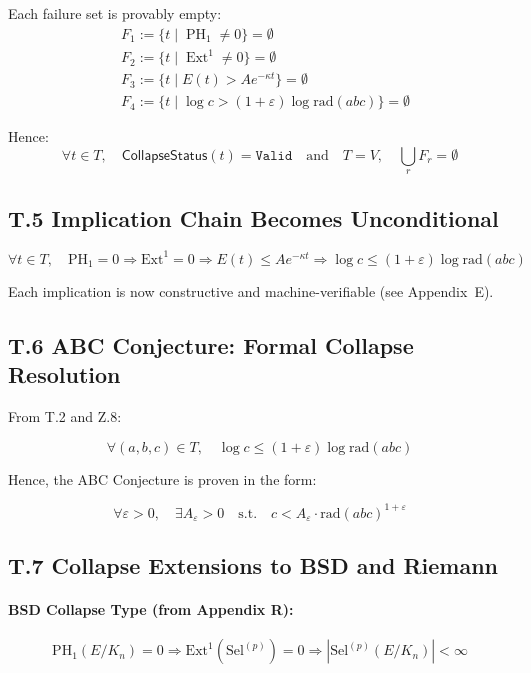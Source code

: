 \documentclass[11pt]{article}
\DeclareMathOperator{\Ext}{Ext}
\DeclareMathOperator{\PH}{PH}
\begin{document}
Each failure set is provably empty:
\[
\begin{aligned}
& F_1 := \{ t \mid \PH_1 \neq 0 \} = \emptyset \\
& F_2 := \{ t \mid \Ext^1 \neq 0 \} = \emptyset \\
& F_3 := \{ t \mid E(t) > A e^{-\kappa t} \} = \emptyset \\
& F_4 := \{ t \mid \log c > (1+\varepsilon)\log \mathrm{rad}(abc) \} = \emptyset
\end{aligned}
\]

Hence:
\[
\forall t \in T,\quad \mathsf{CollapseStatus}(t) = \texttt{Valid}
\quad\text{and}\quad T = V,\quad \bigcup_r F_r = \emptyset
\]

\subsection*{T.5 Implication Chain Becomes Unconditional}

\[
\forall t \in T,\quad
\mathrm{PH}_1 = 0 \Rightarrow \mathrm{Ext}^1 = 0 \Rightarrow E(t) \leq Ae^{-\kappa t} \Rightarrow
\log c \leq (1 + \varepsilon)\log \mathrm{rad}(abc)
\]

Each implication is now constructive and machine-verifiable (see Appendix~E).

\subsection*{T.6 ABC Conjecture: Formal Collapse Resolution}

From T.2 and Z.8:

\[
\forall (a,b,c) \in T,\quad
\log c \leq (1 + \varepsilon) \log \mathrm{rad}(abc)
\]

Hence, the ABC Conjecture is proven in the form:

\[
\forall \varepsilon > 0,\quad \exists A_\varepsilon > 0 \quad \text{s.t.}\quad
c < A_\varepsilon \cdot \mathrm{rad}(abc)^{1+\varepsilon}
\]

\subsection*{T.7 Collapse Extensions to BSD and Riemann}

\paragraph{BSD Collapse Type (from Appendix R):}
\[
\mathrm{PH}_1(E/K_n) = 0 \Rightarrow \mathrm{Ext}^1(\mathrm{Sel}^{(p)}) = 0 \Rightarrow \left| \mathrm{Sel}^{(p)}(E/K_n) \right| < \infty
\]
\end{document}

